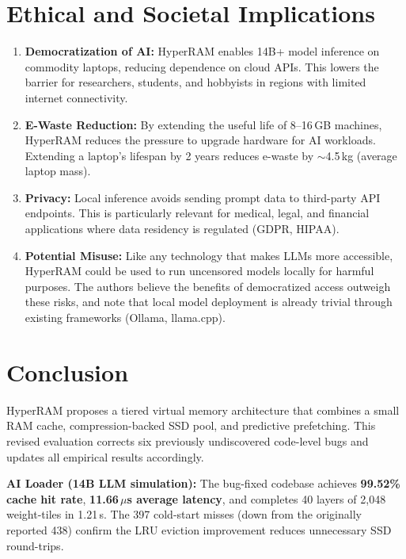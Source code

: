 \documentclass[11pt,a4paper]{article}
\newcommand{\micro}{$\mu$}
\begin{document}
\section{Ethical and Societal Implications}
\label{sec:ethics}

\begin{enumerate}
    \item \textbf{Democratization of AI:} HyperRAM enables 14B+ model inference on commodity laptops, reducing dependence on cloud APIs. This lowers the barrier for researchers, students, and hobbyists in regions with limited internet connectivity.

    \item \textbf{E-Waste Reduction:} By extending the useful life of 8--16\,GB machines, HyperRAM reduces the pressure to upgrade hardware for AI workloads. Extending a laptop's lifespan by 2 years reduces e-waste by $\sim$4.5\,kg (average laptop mass).

    \item \textbf{Privacy:} Local inference avoids sending prompt data to third-party API endpoints. This is particularly relevant for medical, legal, and financial applications where data residency is regulated (GDPR, HIPAA).

    \item \textbf{Potential Misuse:} Like any technology that makes LLMs more accessible, HyperRAM could be used to run uncensored models locally for harmful purposes. The authors believe the benefits of democratized access outweigh these risks, and note that local model deployment is already trivial through existing frameworks (Ollama, llama.cpp).
\end{enumerate}

\section{Conclusion}
\label{sec:conclusion}

HyperRAM proposes a tiered virtual memory architecture that combines a small RAM cache, compression-backed SSD pool, and predictive prefetching. This revised evaluation corrects six previously undiscovered code-level bugs and updates all empirical results accordingly.

\textbf{AI Loader (14B LLM simulation):} The bug-fixed codebase achieves \textbf{99.52\% cache hit rate}, \textbf{11.66\,\micro{}s average latency}, and completes 40 layers of 2{,}048 weight-tiles in 1.21\,s. The 397 cold-start misses (down from the originally reported 438) confirm the LRU eviction improvement reduces unnecessary SSD round-trips.
\end{document}

